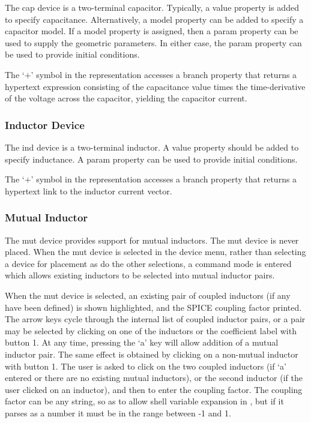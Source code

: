 The {\et cap} device is a two-terminal capacitor.  Typically, a {\et
value} property is added to specify capacitance.  Alternatively, a
{\et model} property can be added to specify a capacitor model.  If a
{\et model} property is assigned, then a {\et param} property can be
used to supply the geometric parameters.  In either case, the {\et
param} property can be used to provide initial conditions.

The `$+$' symbol in the representation accesses a {\et branch}
property that returns a hypertext expression consisting of the
capacitance value times the time-derivative of the voltage across the
capacitor, yielding the capacitor current.

\subsubsection{Inductor Device}

The {\et ind} device is a two-terminal inductor.  A {\et value}
property should be added to specify inductance.  A {\et param}
property can be used to provide initial conditions.

The `$+$' symbol in the representation accesses a {\et branch}
property that returns a hypertext link to the inductor current vector.

\subsubsection{Mutual Inductor}

The {\et mut} device provides support for mutual inductors.  The {\et
mut} device is never placed.  When the {\et mut} device is selected in
the device menu, rather than selecting a device for placement as do
the other selections, a command mode is entered which allows existing
inductors to be selected into mutual inductor pairs.

When the {\et mut} device is selected, an existing pair of coupled
inductors (if any have been defined) is shown highlighted, and the
SPICE coupling factor printed.  The arrow keys cycle through the
internal list of coupled inductor pairs, or a pair may be selected by
clicking on one of the inductors or the coefficient label with button
1.  At any time, pressing the `{\kb a}' key will allow addition of a
mutual inductor pair.  The same effect is obtained by clicking on a
non-mutual inductor with button 1.  The user is asked to click on the
two coupled inductors (if `{\kb a}' entered or there are no existing
mutual inductors), or the second inductor (if the user clicked on an
inductor), and then to enter the coupling factor.  The coupling factor
can be any string, so as to allow shell variable expansion in
{\WRspice}, but if it parses as a number it must be in the range
between -1 and 1.

